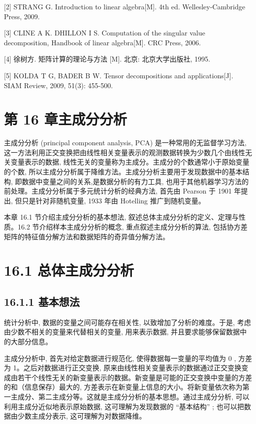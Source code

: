 \documentclass[10pt]{article}
\begin{document}
[2] STRANG G. Introduction to linear algebra[M]. 4th ed. Wellesley-Cambridge Press, 2009.

[3] CLINE A K. DHILLON I S. Computation of the singular value decomposition, Handbook of linear algebra[M]. CRC Press, 2006.

[4] 徐树方. 矩阵计算的理论与方法 [M]. 北京: 北京大学出版社, 1995.

[5] KOLDA T G, BADER B W. Tensor decompositions and applications[J]. SIAM Review, 2009, 51(3): 455-500.

\section*{第 16 章主成分分析}
主成分分析 (principal component analysis, PCA) 是一种常用的无监督学习方法, 这一方法利用正交变换把由线性相关变量表示的观测数据转换为少数几个由线性无关变量表示的数据, 线性无关的变量称为主成分。主成分的个数通常小于原始变量的个数, 所以主成分分析属于降维方法。主成分分析主要用于发现数据中的基本结构, 即数据中变量之间的关系,是数据分析的有力工具, 也用于其他机器学习方法的前处理。主成分分析属于多元统计分析的经典方法, 首先由 Pearson 于 1901 年提出, 但只是针对非随机变量, 1933 年由 Hotelling 推广到随机变量。

本章 16.1 节介绍主成分分析的基本想法, 叙述总体主成分分析的定义、定理与性质。16.2 节介绍样本主成分分析的概念, 重点叙述主成分分析的算法, 包括协方差矩阵的特征值分解方法和数据矩阵的奇异值分解方法。

\section*{16.1 总体主成分分析}
\subsection*{16.1.1 基本想法}
统计分析中, 数据的变量之间可能存在相关性, 以致增加了分析的难度。于是, 考虑由少数不相关的变量来代替相关的变量, 用来表示数据, 并且要求能够保留数据中的大部分信息。

主成分分析中, 首先对给定数据进行规范化, 使得数据每一变量的平均值为 0 , 方差为 1。之后对数据进行正交变换, 原来由线性相关变量表示的数据通过正交变换变成由若干个线性无关的新变量表示的数据。新变量是可能的正交变换中变量的方差的和（信息保存）最大的, 方差表示在新变量上信息的大小。将新变量依次称为第一主成分、第二主成分等。这就是主成分分析的基本思想。通过主成分分析, 可以利用主成分近似地表示原始数据, 这可理解为发现数据的 “基本结构” ; 也可以把数据由少数主成分表示, 这可理解为对数据降维。
\end{document}
